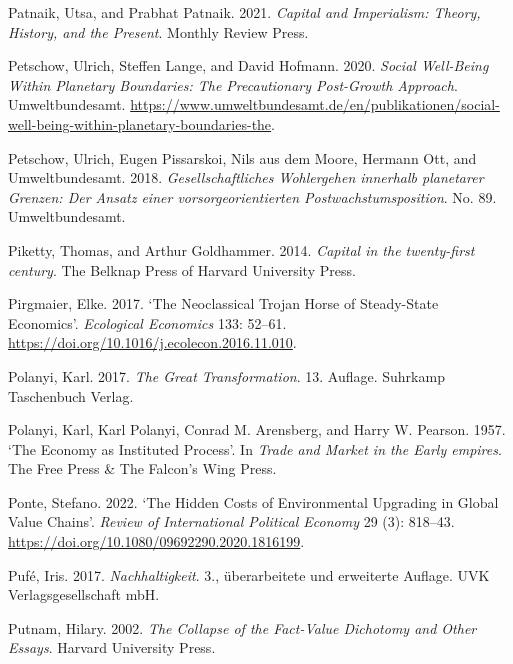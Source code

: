 \documentclass[
  british,
  a4paper,
  DIV=11,
  numbers=noendperiod,
  oneside,
  openany]{scrreprt}
\newlength{\cslhangindent}
\newenvironment{CSLReferences}[2] %
 {\begin{list}{}{%
  \setlength{\itemindent}{0pt}
  \setlength{\leftmargin}{0pt}
  \setlength{\parsep}{0pt}
  \ifodd #1
   \setlength{\leftmargin}{\cslhangindent}
   \setlength{\itemindent}{-1\cslhangindent}
  \fi
  \setlength{\itemsep}{#2\baselineskip}}}
 {\end{list}}
\begin{document}
\begin{CSLReferences}{1}{1}
Patnaik, Utsa, and Prabhat Patnaik. 2021. \emph{Capital and Imperialism:
Theory, History, and the Present}. Monthly Review Press.

Petschow, Ulrich, Steffen Lange, and David Hofmann. 2020. \emph{Social
{Well-Being Within Planetary Boundaries}: The {Precautionary Post-Growth
Approach}}. Umweltbundesamt.
\url{https://www.umweltbundesamt.de/en/publikationen/social-well-being-within-planetary-boundaries-the}.

Petschow, Ulrich, Eugen Pissarskoi, Nils aus dem Moore, Hermann Ott, and
Umweltbundesamt. 2018. \emph{Gesellschaftliches Wohlergehen innerhalb
planetarer Grenzen: Der Ansatz einer vorsorgeorientierten
Postwachstumsposition}. No. 89. Umweltbundesamt.

Piketty, Thomas, and Arthur Goldhammer. 2014. \emph{Capital in the
twenty-first century}. The Belknap Press of Harvard University Press.

Pirgmaier, Elke. 2017. {`The Neoclassical Trojan Horse of Steady-State
Economics'}. \emph{Ecological Economics} 133: 52--61.
\url{https://doi.org/10.1016/j.ecolecon.2016.11.010}.

Polanyi, Karl. 2017. \emph{The Great Transformation}. 13. Auflage.
Suhrkamp Taschenbuch Verlag.

Polanyi, Karl, Karl Polanyi, Conrad M. Arensberg, and Harry W. Pearson.
1957. {`The Economy as Instituted Process'}. In \emph{Trade and Market
in the Early empires}. The Free Press \& The Falcon's Wing Press.

Ponte, Stefano. 2022. {`The Hidden Costs of Environmental Upgrading in
Global Value Chains'}. \emph{Review of International Political Economy}
29 (3): 818--43. \url{https://doi.org/10.1080/09692290.2020.1816199}.

Pufé, Iris. 2017. \emph{Nachhaltigkeit}. 3., überarbeitete und
erweiterte Auflage. UVK Verlagsgesellschaft mbH.

Putnam, Hilary. 2002. \emph{The Collapse of the Fact-Value Dichotomy and
Other Essays}. Harvard University Press.


\end{CSLReferences}
\end{document}
